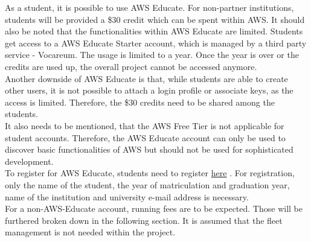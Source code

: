 \documentclass[plainarticle,zihtitle,english,final,hyperref,utf8]{zihpub}
\begin{document}
As a student, it is possible to use AWS Educate. For non-partner institutions, students will be provided a \$30 credit which can be spent within AWS. It should also be noted that the functionalities within AWS Educate are limited. 
Students get access to a AWS Educate Starter account, which is managed by a third party service - Vocareum.
The usage is limited to a year. Once the year is over or the credits are used up, the overall project cannot be accessed anymore. \\
Another downside of AWS Educate is that, while students are able to create other users, it is not possible to attach a login profile or associate keys, as the access is limited. Therefore, the \$30 credits need to be shared among the students.\\
It also needs to be mentioned, that the AWS Free Tier is not applicable for student accounts. Therefore, the AWS Educate account can only be used to discover basic functionalities of AWS but should not be used for sophisticated development.\\
To register for AWS Educate, students need to register \href{https://www.awseducate.com/login?startURL=\%2Fregistration}{here} \cite{awseducatereg}. For registration, only the name of the student, the year of matriculation and graduation year, name of the institution and university e-mail address is necessary.\\
\newline
\newpage
{}
For a non-AWS-Educate account, running fees are to be expected. Those will be furthered broken down in the following section. It is assumed that the fleet management is not needed within the project.
\end{document}
